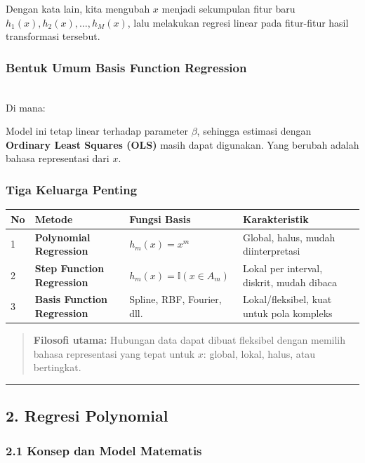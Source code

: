 \documentclass[12pt,a4paper]{article}
\begin{document}
Dengan kata lain, kita mengubah $x$ menjadi sekumpulan fitur baru $h_1(x), h_2(x), \dots, h_M(x)$, lalu melakukan regresi linear pada fitur-fitur hasil transformasi tersebut.


\subsubsection{Bentuk Umum Basis Function Regression}

\\[
\hat{y}(x) = \beta_0 + \sum_{m=1}^{M} \beta_m h_m(x)
\\]


Di mana:


Model ini tetap linear terhadap parameter $\beta$, sehingga estimasi dengan \textbf{Ordinary Least Squares (OLS)} masih dapat digunakan. Yang berubah adalah bahasa representasi dari $x$.


\subsubsection{Tiga Keluarga Penting}

\begin{tabular}{|l|l|l|l|}
\hline
No & Metode & Fungsi Basis & Karakteristik \\
\hline
1 & \textbf{Polynomial Regression} & $h_m(x) = x^m$ & Global, halus, mudah diinterpretasi \\
\hline
2 & \textbf{Step Function Regression} & $h_m(x) = \mathbb{I}(x \in A_m)$ & Lokal per interval, diskrit, mudah dibaca \\
\hline
3 & \textbf{Basis Function Regression} & Spline, RBF, Fourier, dll. & Lokal/fleksibel, kuat untuk pola kompleks \\
\hline
\end{tabular}


\begin{quote}
\textbf{Filosofi utama:} Hubungan data dapat dibuat fleksibel dengan memilih bahasa representasi yang tepat untuk $x$: global, lokal, halus, atau bertingkat.\end{quote}


\hrule


\subsection{2. Regresi Polynomial}

\subsubsection{2.1 Konsep dan Model Matematis}
\end{document}
